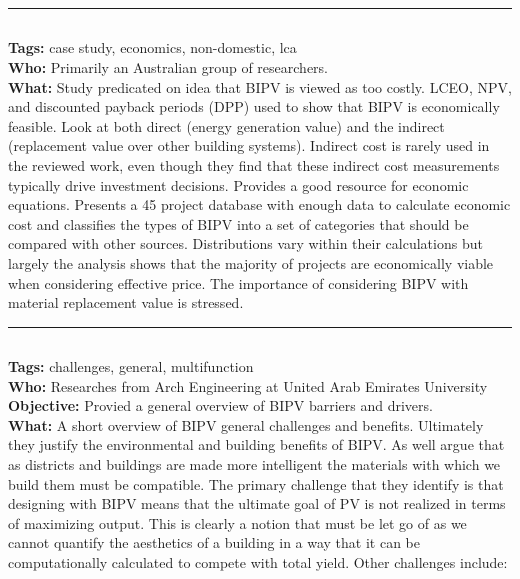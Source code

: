 \documentclass[11pt,a4paper]{article}
\begin{document}
\noindent\rule{\textwidth}{1pt}
\subsection*{}
\textbf{Tags:} case study, economics, non-domestic, lca  \\
\textbf{Who:} Primarily an Australian group of researchers. \\
\textbf{What:} Study predicated on idea that BIPV is viewed as too costly. LCEO, NPV, and discounted payback periods (DPP) used to show that BIPV is economically feasible. Look at both direct (energy generation value) and the indirect (replacement value over other building systems). Indirect cost is rarely used in the reviewed work, even though they find that these indirect cost measurements typically drive investment decisions. Provides a good resource for economic equations. Presents a 45 project database with enough data to calculate economic cost and classifies the types of BIPV into a set of categories that should be compared with other sources. Distributions vary within their calculations but largely the analysis shows that the majority of projects are economically viable when considering effective price. The importance of considering BIPV with material replacement value is stressed.

\noindent\rule{\textwidth}{1pt}
\subsection*{}
\textbf{Tags:} challenges, general, multifunction \\
\textbf{Who:} Researches from Arch Engineering at United Arab Emirates University  \\
\textbf{Objective:}  Provied a general overview of BIPV barriers and drivers. \\
\textbf{What:} A short overview of BIPV general challenges and benefits. Ultimately they justify the environmental and building benefits of BIPV. As well argue that as districts and buildings are made more intelligent the materials with which we build them must be compatible. The primary challenge that they identify is that designing with BIPV means that the ultimate goal of PV is not realized in terms of maximizing output. This is clearly a notion that must be let go of as we cannot quantify the aesthetics of a building in a way that it can be computationally calculated to compete with total yield. Other challenges include:
\end{document}
